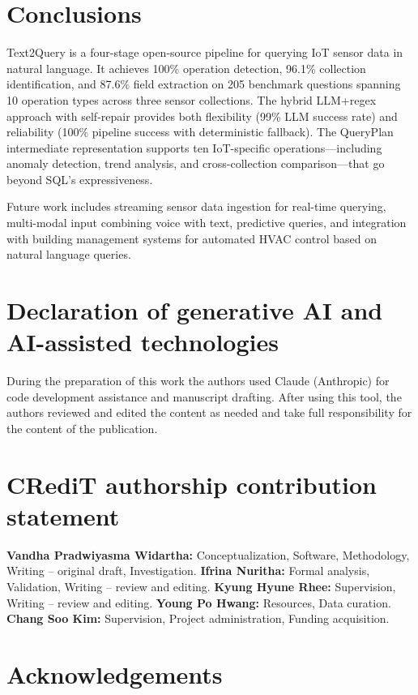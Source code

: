 \documentclass[preprint,12pt,a4paper]{elsarticle}
\begin{document}
\section{Conclusions}

Text2Query is a four-stage open-source pipeline for querying IoT sensor data in natural language. It achieves 100\% operation detection, 96.1\% collection identification, and 87.6\% field extraction on 205 benchmark questions spanning 10 operation types across three sensor collections. The hybrid LLM+regex approach with self-repair provides both flexibility (99\% LLM success rate) and reliability (100\% pipeline success with deterministic fallback). The QueryPlan intermediate representation supports ten IoT-specific operations---including anomaly detection, trend analysis, and cross-collection comparison---that go beyond SQL's expressiveness.

Future work includes streaming sensor data ingestion for real-time querying, multi-modal input combining voice with text, predictive queries, and integration with building management systems for automated HVAC control based on natural language queries.

\section*{Declaration of generative AI and AI-assisted technologies}

During the preparation of this work the authors used Claude (Anthropic) for code development assistance and manuscript drafting. After using this tool, the authors reviewed and edited the content as needed and take full responsibility for the content of the publication.

\section*{CRediT authorship contribution statement}

\textbf{Vandha Pradwiyasma Widartha:} Conceptualization, Software, Methodology, Writing -- original draft, Investigation. \textbf{Ifrina Nuritha:} Formal analysis, Validation, Writing -- review and editing. \textbf{Kyung Hyune Rhee:} Supervision, Writing -- review and editing. \textbf{Young Po Hwang:} Resources, Data curation. \textbf{Chang Soo Kim:} Supervision, Project administration, Funding acquisition.

\section*{Acknowledgements}
\end{document}
